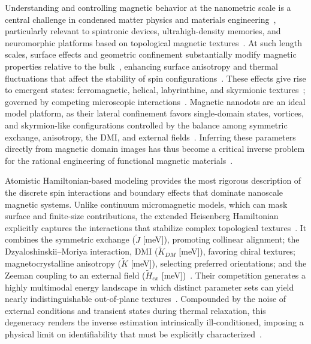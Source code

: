 \documentclass[final,5p,times,twocolumn]{elsarticle}
\begin{document}
Understanding and controlling magnetic behavior at the nanometric scale is a central challenge in condensed matter physics and materials engineering~\cite{heinrich2021quantum}, particularly relevant to spintronic devices, ultrahigh-density memories, and neuromorphic platforms based on topological magnetic textures~\cite{fert2024electrical}. At such length scales, surface effects and geometric confinement substantially modify magnetic properties relative to the bulk~\cite{batlle2022magnetic}, enhancing surface anisotropy and thermal fluctuations that affect the stability of spin configurations~\cite{charalampidis2023metadynamics}. These effects give rise to emergent states: ferromagnetic, helical, labyrinthine, and skyrmionic textures~\cite{yu2021magnetic}; governed by competing microscopic interactions~\cite{tokura2020magnetic}. Magnetic nanodots are an ideal model platform, as their lateral confinement favors single-domain states, vortices, and skyrmion-like configurations controlled by the balance among symmetric exchange, anisotropy, the DMI, and external fields~\cite{kuchkin2020magnetic}. Inferring these parameters directly from magnetic domain images has thus become a critical inverse problem for the rational engineering of functional magnetic materials~\cite{kong2023quantifying}.

Atomistic Hamiltonian-based modeling provides the most rigorous description of the discrete spin interactions and boundary effects that dominate nanoscale magnetic systems. Unlike continuum micromagnetic models, which can mask surface and finite-size contributions, the extended Heisenberg Hamiltonian explicitly captures the interactions that stabilize complex topological textures~\cite{goerzen2022atomistic}. It combines the symmetric exchange ($\tilde{J}$ [meV]), promoting collinear alignment; the Dzyaloshinskii--Moriya interaction, DMI ($\tilde{K}_{DM}$ [meV]), favoring chiral textures; magnetocrystalline anisotropy ($\tilde{K}$ [meV]), selecting preferred orientations; and the Zeeman coupling to an external field ($\tilde{H}_{ex}$ [meV])~\cite{aldarawsheh2023intrinsic}. Their competition generates a highly multimodal energy landscape in which distinct parameter sets can yield nearly indistinguishable out-of-plane textures~\cite{back20202020}. Compounded by the noise of external conditions and transient states during thermal relaxation, this degeneracy renders the inverse estimation intrinsically ill-conditioned, imposing a physical limit on identifiability that must be explicitly characterized~\cite{murakami2022inverse}.
\end{document}
